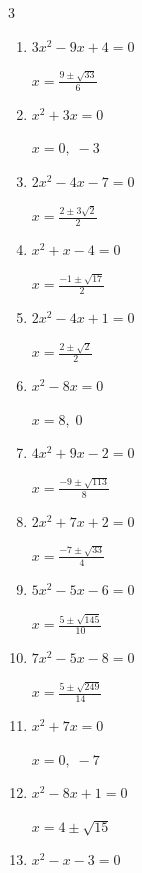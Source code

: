 \begin{multicols}{3}
\begin{enumerate}
        $\displaystyle x=\frac{-3\pm 6\sqrt{2}}{7}$

  \item $3x^{2}-9x+4=0$

        $\displaystyle x=\frac{9\pm \sqrt{33}}{6}$

  \item $x^{2}+3x=0$

        $\displaystyle x=0, \; -3$

  \item $2x^{2}-4x-7=0$

        $\displaystyle x=\frac{2\pm 3\sqrt{2}}{2}$

  \item $x^{2}+x-4=0$

        $\displaystyle x=\frac{-1\pm \sqrt{17}}{2}$

\columnbreak %

  \item $2x^{2}-4x+1=0$

        $\displaystyle x=\frac{2\pm \sqrt{2}}{2}$

  \item $x^{2}-8x=0$

        $\displaystyle x=8, \; 0$

  \item $4x^{2}+9x-2=0$

        $\displaystyle x=\frac{-9\pm \sqrt{113}}{8}$

  \item $2x^{2}+7x+2=0$

        $\displaystyle x=\frac{-7\pm \sqrt{33}}{4}$

  \item $5x^{2}-5x-6=0$

        $\displaystyle x=\frac{5\pm \sqrt{145}}{10}$

  \item $7x^{2}-5x-8=0$

        $\displaystyle x=\frac{5\pm \sqrt{249}}{14}$

  \item $x^{2}+7x=0$

        $\displaystyle x=0, \; -7$

\columnbreak %

\resetques

  \item $x^{2}-8x+1=0$

        $\displaystyle x=4\pm \sqrt{15}$

  \item $x^{2}-x-3=0$


\end{enumerate}
\end{multicols}
